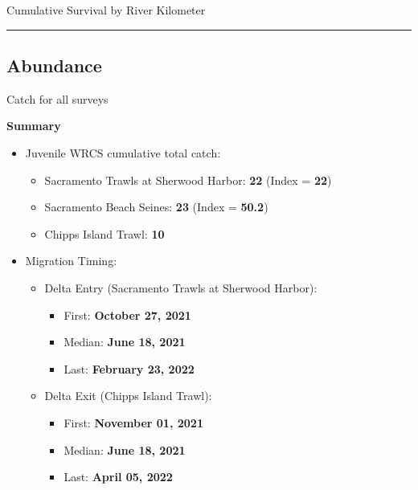 \documentclass[
]{book}
\providecommand{\tightlist}{%
  \setlength{\itemsep}{0pt}\setlength{\parskip}{0pt}}
\theoremstyle{definition}
\theoremstyle{definition}
\theoremstyle{definition}
\theoremstyle{definition}
\theoremstyle{remark}
\begin{document}
\label{fig:hatcherysurvival-fig}Cumulative Survival by River Kilometer

\begin{center}\rule{0.5\linewidth}{0.5pt}\end{center}

\hypertarget{abundance}{%
\subsection{Abundance}\label{abundance}}

Catch for all surveys

\textbf{Summary}

\begin{itemize}
\tightlist
\item
  Juvenile WRCS cumulative total catch:

  \begin{itemize}
  \tightlist
  \item
    Sacramento Trawls at Sherwood Harbor: \textbf{22} (Index = \textbf{22})
  \item
    Sacramento Beach Seines: \textbf{23} (Index = \textbf{50.2})
  \item
    Chipps Island Trawl: \textbf{10}
  \end{itemize}
\item
  Migration Timing:

  \begin{itemize}
  \tightlist
  \item
    Delta Entry (Sacramento Trawls at Sherwood Harbor):

    \begin{itemize}
    \tightlist
    \item
      First: \textbf{October 27, 2021}\\
    \item
      Median: \textbf{June 18, 2021}
    \item
      Last: \textbf{February 23, 2022}
    \end{itemize}
  \item
    Delta Exit (Chipps Island Trawl):

    \begin{itemize}
    \tightlist
    \item
      First: \textbf{November 01, 2021}\\
    \item
      Median: \textbf{June 18, 2021}
    \item
      Last: \textbf{April 05, 2022}
    \end{itemize}
  \end{itemize}
\end{itemize}
\end{document}
